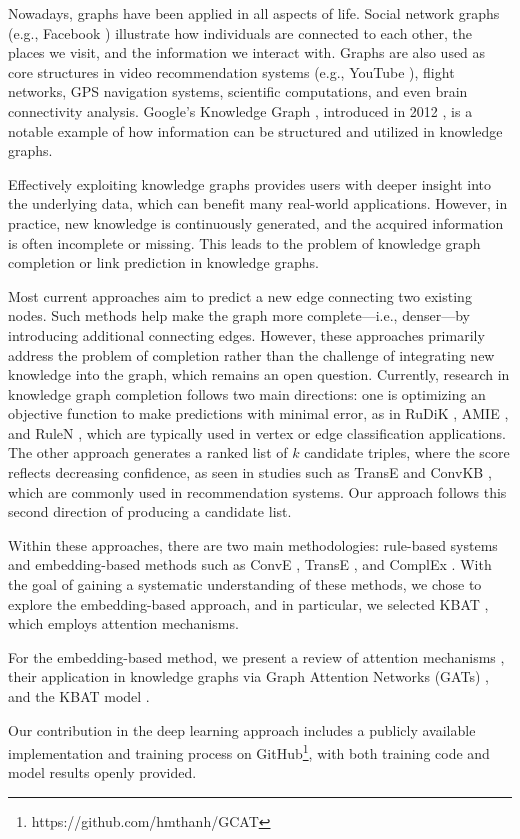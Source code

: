 Nowadays, graphs have been applied in all aspects of life. Social network graphs (e.g., Facebook \cite{ugander2011anatomy}) illustrate how individuals are connected to each other, the places we visit, and the information we interact with. Graphs are also used as core structures in video recommendation systems (e.g., YouTube \cite{baluja2008video}), flight networks, GPS navigation systems, scientific computations, and even brain connectivity analysis. Google’s Knowledge Graph \cite{googlekg:2020}, introduced in 2012 \cite{ji2020survey}, is a notable example of how information can be structured and utilized in knowledge graphs.

Effectively exploiting knowledge graphs provides users with deeper insight into the underlying data, which can benefit many real-world applications. However, in practice, new knowledge is continuously generated, and the acquired information is often incomplete or missing. This leads to the problem of knowledge graph completion or link prediction in knowledge graphs.

Most current approaches aim to predict a new edge connecting two existing nodes. Such methods help make the graph more complete—i.e., denser—by introducing additional connecting edges. However, these approaches primarily address the problem of completion rather than the challenge of integrating new knowledge into the graph, which remains an open question. Currently, research in knowledge graph completion follows two main directions: one is optimizing an objective function to make predictions with minimal error, as in RuDiK \cite{ortona2018robust}, AMIE \cite{galarraga2015fast}, and RuleN \cite{meilicke2018fine}, which are typically used in vertex or edge classification applications. The other approach generates a ranked list of \(k\) candidate triples, where the score reflects decreasing confidence, as seen in studies such as TransE \cite{bordes2013translating} and ConvKB \cite{vu2019capsule}, which are commonly used in recommendation systems. Our approach follows this second direction of producing a candidate list.

Within these approaches, there are two main methodologies: rule-based systems and embedding-based methods such as ConvE \cite{dettmers2017convolutional}, TransE \cite{bordes2013translating}, and ComplEx \cite{trouillon2016complex}. With the goal of gaining a systematic understanding of these methods, we chose to explore the embedding-based approach, and in particular, we selected KBAT \cite{nathani2019learning}, which employs attention mechanisms.

For the embedding-based method, we present a review of attention mechanisms \cite{vaswani2017attention}, their application in knowledge graphs via Graph Attention Networks (GATs) \cite{velivckovic2017graph}, and the KBAT model \cite{nathani2019learning}.

Our contribution in the deep learning approach includes a publicly available implementation and training process on GitHub\footnote{https://github.com/hmthanh/GCAT}, with both training code and model results openly provided.
